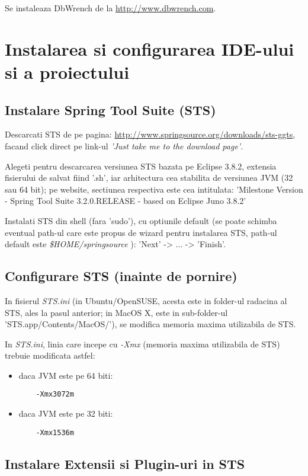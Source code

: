 Se instaleaza DbWrench de la \url{http://www.dbwrench.com}.

\section{Instalarea si configurarea IDE-ului si a proiectului}

\subsection{Instalare Spring Tool Suite (STS)}
Descarcati STS de pe pagina:
\url{http://www.springsource.org/downloads/sts-ggts},
facand click direct pe link-ul \emph{'Just take me to the download page'}.

Alegeti pentru descarcarea versiunea STS bazata pe Eclipse 3.8.2, extensia
fisierului de salvat fiind '.sh', iar arhitectura cea stabilita de versiunea
JVM (32 sau 64 bit); pe website, sectiunea respectiva este cea intitulata:
'Milestone Version - Spring Tool Suite 3.2.0.RELEASE - based on Eclipse Juno 3.8.2'

Instalati STS din shell (fara 'sudo'), cu optiunile default (se poate
schimba eventual path-ul care este propus de wizard pentru instalarea STS,
path-ul default este \emph{\$HOME/springsource} ):
'Next' -> ... -> 'Finish'.

\subsection{Configurare STS (inainte de pornire)}
In fisierul \emph{STS.ini} (in Ubuntu/OpenSUSE, acesta este in folder-ul
radacina al STS, ales la pasul anterior; in MacOS X, este in sub-folder-ul
'STS.app/Contents/MacOS/'), se modifica memoria maxima utilizabila de STS.

In \emph{STS.ini}, linia care incepe cu \emph{-Xmx} (memoria maxima utilizabila
de STS) trebuie modificata astfel:
\begin{itemize} 
\item daca JVM este pe 64 biti:
\begin{lstlisting}
	-Xmx3072m
\end{lstlisting}
\item daca JVM este pe 32 biti:
\begin{lstlisting}
	-Xmx1536m
\end{lstlisting}
\end{itemize}

\subsection{Instalare Extensii si Plugin-uri in STS}

